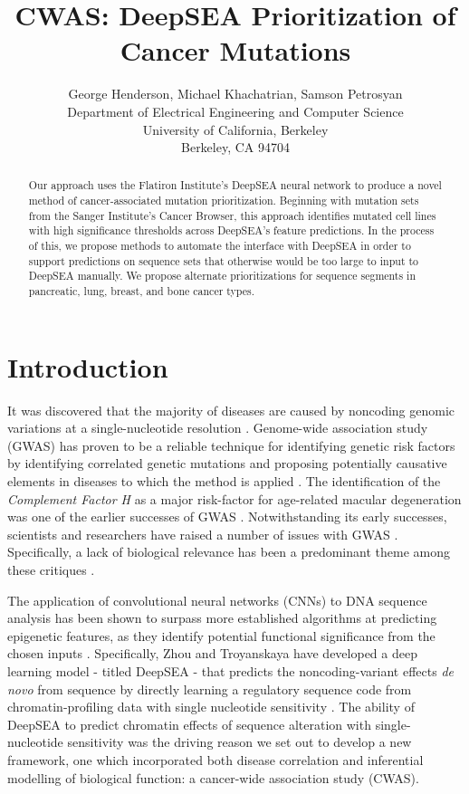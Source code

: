 \documentclass{article}
\title{CWAS: DeepSEA Prioritization of Cancer Mutations}
\author{%
  George Henderson, Michael Khachatrian, Samson Petrosyan\\
  Department of Electrical Engineering and Computer Science\\
  University of California, Berkeley\\
  Berkeley, CA 94704 \\
}
\begin{document}
\maketitle

\begin{abstract}
  Our approach uses the Flatiron Institute's DeepSEA neural network to produce a novel method of cancer-associated mutation prioritization. Beginning with mutation sets from the Sanger Institute's Cancer Browser, this approach identifies mutated cell lines with high significance thresholds across DeepSEA's feature predictions. In the process of this, we propose methods to automate the interface with DeepSEA in order to support predictions on sequence sets that otherwise would be too large to input to DeepSEA manually. We propose alternate prioritizations for sequence segments in pancreatic, lung, breast, and bone cancer types.
\end{abstract}


\section{Introduction}
It was discovered that the majority of diseases are caused by noncoding genomic variations at a single-nucleotide resolution \cite{1}. Genome-wide association study (GWAS) has proven to be a reliable technique for identifying genetic risk factors by  identifying correlated genetic mutations and proposing potentially causative elements in diseases to which the method is applied \cite{2}. The identification of the \textit{Complement Factor H} as a major risk-factor for age-related macular degeneration was one of the earlier successes of GWAS \cite{3, 4, 5}. Notwithstanding  its early successes, scientists and researchers have raised a number of issues with GWAS \cite{2}. Specifically, a lack of biological relevance has been a predominant theme among these critiques \cite{6, 7, 8}. 

The application of convolutional neural networks (CNNs) to DNA sequence analysis has been shown to surpass more established algorithms at predicting epigenetic features, as they identify  potential functional significance from the chosen inputs \cite{9, 10}. Specifically, Zhou and Troyanskaya have developed a deep learning model - titled DeepSEA - that predicts the noncoding-variant effects \textit{de novo} from sequence by directly learning a regulatory sequence code from chromatin-profiling data with single nucleotide sensitivity \cite{10}. The ability of DeepSEA to predict chromatin effects of sequence alteration with single-nucleotide sensitivity was the driving reason we set out to develop a new framework, one which incorporated both disease correlation and inferential modelling of biological function: a cancer-wide association study (CWAS). 
\end{document}
